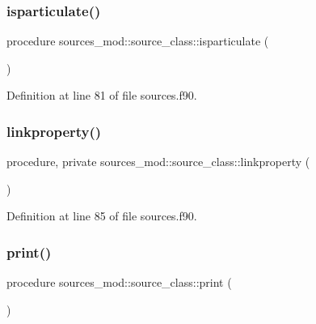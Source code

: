 \subsubsection{\texorpdfstring{isparticulate()}{isparticulate()}}
{\footnotesize\ttfamily procedure sources\+\_\+mod\+::source\+\_\+class\+::isparticulate (\begin{DoxyParamCaption}{ }\end{DoxyParamCaption})\hspace{0.3cm}{\ttfamily [private]}}



Definition at line 81 of file sources.\+f90.

\mbox{\label{structsources__mod_1_1source__class_a58282637980cd13f683be32cb57dc227}} 
\subsubsection{\texorpdfstring{linkproperty()}{linkproperty()}}
{\footnotesize\ttfamily procedure, private sources\+\_\+mod\+::source\+\_\+class\+::linkproperty (\begin{DoxyParamCaption}{ }\end{DoxyParamCaption})\hspace{0.3cm}{\ttfamily [private]}}



Definition at line 85 of file sources.\+f90.

\mbox{\label{structsources__mod_1_1source__class_af632299e6c5e29a7f2008417aa68d529}} 
\subsubsection{\texorpdfstring{print()}{print()}}
{\footnotesize\ttfamily procedure sources\+\_\+mod\+::source\+\_\+class\+::print (\begin{DoxyParamCaption}{ }\end{DoxyParamCaption})\hspace{0.3cm}{\ttfamily [private]}}



